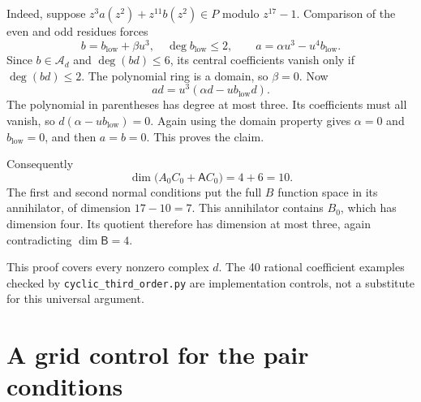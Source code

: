 \documentclass[11pt]{article}
\theoremstyle{definition}\newtheorem{definition}[theorem]{Definition}
\theoremstyle{remark}\newtheorem{remark}[theorem]{Remark}
\begin{document}
Indeed, suppose $z^3a(z^2)+z^{11}b(z^2)\in P$ modulo $z^{17}-1$.
Comparison of the even and odd residues forces
\[
 b=b_{\mathrm{low}}+\beta u^3,\quad \deg b_{\mathrm{low}}\leq2,
 \qquad a=\alpha u^3-u^4b_{\mathrm{low}}.
\]
Since $b\in\mathcal A_d$ and $\deg(bd)\leq6$, its central coefficients
vanish only if $\deg(bd)\leq2$. The polynomial ring is a domain, so $\beta=0$.
Now
\[
 ad=u^3(\alpha d-u b_{\mathrm{low}}d).
\]
The polynomial in parentheses has degree at most three. Its coefficients
must all vanish, so $d(\alpha-u b_{\mathrm{low}})=0$. Again using the domain
property gives $\alpha=0$ and $b_{\mathrm{low}}=0$, and then $a=b=0$.
This proves the claim.

Consequently
\[
 \dim\big(A_0C_0+\mathsf A C_0\big)=4+6=10.
\]
The first and second normal conditions put the full $B$ function space in
its annihilator, of dimension $17-10=7$. This annihilator contains $B_0$,
which has dimension four. Its quotient therefore has dimension at most
three, again contradicting $\dim\mathsf B=4$.

This proof covers every nonzero complex $d$. The 40 rational coefficient
examples checked by \texttt{cyclic\_third\_order.py} are implementation
controls, not a substitute for this universal argument.

\section{A grid control for the pair conditions}\label{app:gridcontrol}
\end{document}
